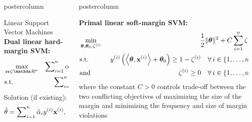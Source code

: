 \documentclass{beamer}
\newlength{\columnheight} %
\begin{document}
\begin{frame}[fragile]{}
\begin{columns}
\begin{column}{.31\textwidth}
\begin{beamercolorbox}[center]{postercolumn}
\begin{minipage}{.98\textwidth}
{\begin{myblock}{Linear Support Vector Machines}
								\textbf{Dual linear hard-margin SVM:}
								\begin{eqnarray*}
									& \max\limits_{\alphav \in \R^n} & \sum\nolimits_{i=1}^n \alpha_i - \frac{1}{2}\sum\nolimits_{i=1}^n\sum\nolimits_{j=1}^n\alpha_i\alpha_j\yi y^{(j)} \scp{\xi}{\xv^{(j)}} \\
									& \text{s.t.} & \sum\nolimits_{i=1}^n \alpha_i \yi = 0, 
									\quad \text{and} \quad \alpha_i \ge 0~\forall i \in \nset
								\end{eqnarray*}
								Solution (if existing):
								$$
								\hat{\theta} = \sum\nolimits_{i=1}^n \hat \alpha_i y^{(i)} \mathbf{x}^{(i)}, \quad \theta_0 = y^{(i)} - \left\langle \bm{\theta}, \mathbf{x}^{(i)} \right\rangle.
								$$
							\end{myblock}
						}
					\end{minipage}
				\end{beamercolorbox}
			\end{column}
			\begin{column}{.31\textwidth}
				\begin{beamercolorbox}[center]{postercolumn}
					\begin{minipage}{.98\textwidth}
						\parbox[t][\columnheight]{\textwidth}{
						\begin{myblock}{} \vspace{-4ex}
							\textbf{Primal linear soft-margin SVM:} 	
							\begin{eqnarray*}
								& \min\limits_{\bm{\theta}, \bm{\theta}_0,\zeta^{(i)}} & \frac{1}{2} \|\bm{\theta}\|^2 + C   \sum_{i=1}^n \zeta^{(i)} \\
								& \text{s.t.} & \,\, y^{(i)}  \left( \left\langle \bm{\theta}, \mathbf{x}^{(i)} \right\rangle + \bm{\theta}_0 \right) \geq 1 - \zeta^{(i)} \quad \forall\, i \in \{1, \ldots, n\},\\
								& \text{and} & \,\, \zeta^{(i)} \geq 0 \quad \forall\, i \in \{1, \ldots, n\},\\
							\end{eqnarray*}
							where the constant $C > 0$ controls trade-off between the two conflicting
							objectives of maximizing the size of the margin and minimizing the
							frequency and size of margin violations\\
							

\end{myblock}}
\end{minipage}
\end{beamercolorbox}
\end{column}
\end{columns}
\end{frame}
\end{document}
